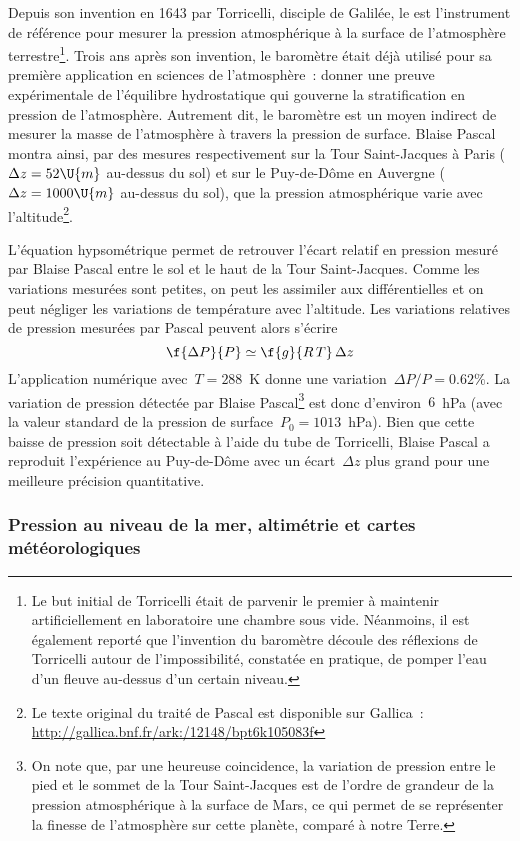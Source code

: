 \sk
Depuis son invention en 1643 par Torricelli, disciple de Galilée, le  est l'instrument de référence pour mesurer la pression atmosphérique à la surface de l'atmosphère terrestre\footnote{Le but initial de Torricelli était de parvenir le premier à maintenir artificiellement en laboratoire une chambre sous vide. Néanmoins, il est également reporté que l'invention du baromètre découle des réflexions de Torricelli autour de l'impossibilité, constatée en pratique, de pomper l'eau d'un fleuve au-dessus d'un certain niveau.}. Trois ans après son invention, le baromètre était déjà utilisé pour sa première application en sciences de l'atmosphère~: donner une preuve expérimentale de l'équilibre hydrostatique qui gouverne la stratification en pression de l'atmosphère. Autrement dit, le baromètre est un moyen indirect de mesurer la masse de l'atmosphère à travers la pression de surface. Blaise Pascal montra ainsi, par des mesures respectivement sur la Tour Saint-Jacques à Paris ($ \Delta z = 52 \U{m} $ au-dessus du sol) et sur le Puy-de-Dôme en Auvergne ($ \Delta z = 1000 \U{m} $ au-dessus du sol), que la pression atmosphérique varie avec l'altitude\footnote{Le texte original du traité de Pascal est disponible sur Gallica~: \url{http://gallica.bnf.fr/ark:/12148/bpt6k105083f}}.

\sk
L'équation hypsométrique permet de retrouver l'écart relatif en pression mesuré par Blaise Pascal entre le sol et le haut de la Tour Saint-Jacques. Comme les variations mesurées sont petites, on peut les assimiler aux différentielles et on peut négliger les variations de température avec l'altitude. Les variations relatives de pression mesurées par Pascal peuvent alors s'écrire
\[ \f{\Delta P}{P} \simeq \f{g}{R\,T} \, \Delta z \]
L'application numérique avec~$T = 288$~K donne une variation~$\Delta P / P = 0.62 \%$. La variation de pression détectée par Blaise Pascal\footnote{On note que, par une heureuse coincidence, la variation de pression entre le pied et le sommet de la Tour Saint-Jacques est de l'ordre de grandeur de la pression atmosphérique à la surface de Mars, ce qui permet de se représenter la finesse de l'atmosphère sur cette planète, comparé à notre Terre.} est donc d'environ~$6$~hPa (avec la valeur standard de la pression de surface~$P_0 = 1013$~hPa). Bien que cette baisse de pression soit détectable à l'aide du tube de Torricelli, Blaise Pascal a reproduit l'expérience au Puy-de-Dôme avec un écart~$\Delta z$ plus grand pour une meilleure précision quantitative. 

\sk
\subsubsection{Pression au niveau de la mer, altimétrie et cartes météorologiques}

